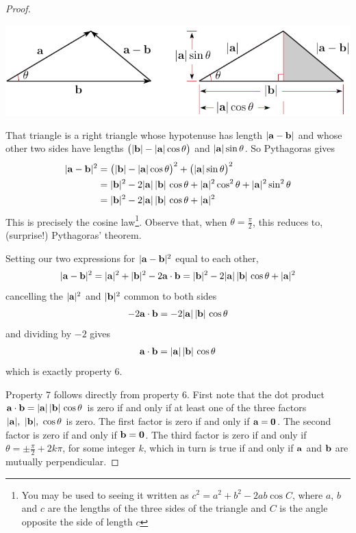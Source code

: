 \begin{proof}
      \begin{efig} 
      \begin{center}
      \includegraphics{cosineB.pdf}
      \end{center}
      \end{efig}
That triangle is a right triangle whose hypotenuse has length $|\mathbf{a}-\mathbf{b}|$ 
and  whose other two sides have lengths $\big(|\mathbf{b}|-|\mathbf{a}|\cos\theta\big)$ 
and $|\mathbf{a}|\sin\theta$. So Pythagoras gives
\begin{align*}
|\mathbf{a}-\mathbf{b}|^2&=\big(|\mathbf{b}|-|\mathbf{a}|\cos\theta\big)^2+
\big(|\mathbf{a}|\sin\theta\big)^2\\
&=|\mathbf{b}|^2-2|\mathbf{a}|\,|\mathbf{b}|\,\cos\theta+|\mathbf{a}|^2\cos^2\theta
+|\mathbf{a}|^2\sin^2\theta\\
&=|\mathbf{b}|^2-2|\mathbf{a}|\,|\mathbf{b}|\,\cos\theta+|\mathbf{a}|^2
\end{align*}
This is precisely the cosine law\footnote{You may be used to seeing it written as $c^2=a^2+b^2-2 a b \cos C$, where $a$, $b$ and $c$ are the lengths of the 
three sides of the triangle and $C$ is the angle opposite the side of length $c$}. 
Observe that, when $\theta=\tfrac{\pi}{2}$, 
this reduces to, (surprise!) Pythagoras' theorem.

Setting our two expressions for $|\mathbf{a}-\mathbf{b}|^2$ equal to each other,
\begin{align*}
|\mathbf{a}-\mathbf{b}|^2=|\mathbf{a}|^2+|\mathbf{b}|^2-2\mathbf{a}\cdot\mathbf{b}
=|\mathbf{b}|^2-2|\mathbf{a}|\,|\mathbf{b}|\,\cos\theta+|\mathbf{a}|^2
\end{align*}
cancelling the $|\mathbf{a}|^2$ and $|\mathbf{b}|^2$ common to both sides
\begin{align*}
-2\mathbf{a}\cdot\mathbf{b}
=-2|\mathbf{a}|\,|\mathbf{b}|\,\cos\theta
\end{align*}
and dividing by $-2$ gives 
\begin{align*}
\mathbf{a}\cdot\mathbf{b}=|\mathbf{a}|\,|\mathbf{b}|\,\cos\theta
\end{align*}
which is exactly property 6. 


Property 7 follows directly from property 6. First note that the dot product $\mathbf{a}\cdot\mathbf{b}=|\mathbf{a}|\,|\mathbf{b}|\,\cos\theta$
is zero if and only if at least one of the three factors 
$|\mathbf{a}|,\ |\mathbf{b}|,\ \cos\theta$ is zero. The first factor is zero if
and only if $\mathbf{a}=\mathbf{0} $. The second factor is zero if and only if 
$\mathbf{b}=\mathbf{0} $.
The third factor is zero if and only if $\theta=\pm\tfrac{\pi}{2}+2k\pi$,
for some integer $k$, which in turn is true if and only if $\mathbf{a}$ and 
$\mathbf{b}$ are mutually perpendicular.
\end{proof}
